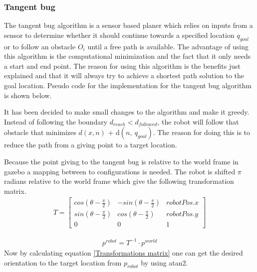 \documentclass[../Head/Main.tex]{subfiles}
\begin{document}
\subsubsection{Tangent bug}
The tangent bug algorithm is a sensor based planer which relies on inputs from a sensor to determine whether it should continue towards a  specified location $q_{goal}$ or to follow an obstacle $O_i$ until a free path is available. The advantage of using this algorithm is the computational minimization and the fact that it only needs a start and end point. The reason for using this algorithm is the benefits just explained and that it will always try to achieve a shortest path solution to the goal location. Pseudo code for the implementation for the tangent bug algorithm is shown below.        

It has been decided to make small changes to the algorithm and make it greedy. Instead of following the boundary $d_{reach} < d_{followed}$, the robot will follow that obstacle that minimizes ${d(x,n)}$ + d$\left(n,~q_{goal}\right)$. The reason for doing this is to reduce the path from a giving point to a target location. \par
Because the point giving to the tangent bug is relative to the world frame in gazebo a mapping between to configurations is needed. The robot is shifted $\pi$ radians relative to the world frame which give the following transformation matrix.
\begin{align}
	T = \begin{bmatrix} 
	   cos(\theta-\frac{\pi}{2}) &  -sin(\theta-\frac{\pi}{2}) & robotPos.x \\ 
	    sin(\theta-\frac{\pi}{2}) &  cos(\theta-\frac{\pi}{2}) & robotPos.y \\
	    0 & 0 & 1					
	\end{bmatrix} 
\end{align}

\begin{align}
	p^{robot} = T^{-1} \cdot {p^{world}}
	\label{Transformations matrix}
\end{align}
Now by calculating equation \ref{Transformations matrix} one can get the desired orientation to the target location from $p_{robot}$ by using atan2.
\end{document}
